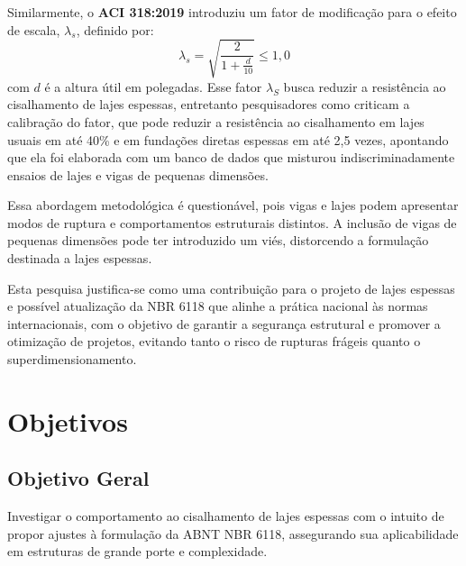 Similarmente, o \textbf{ACI 318:2019}\cite{ACI318:2019} introduziu um fator de modificação para o efeito de escala, $\lambda_s$, definido por:
\begin{equation}
\lambda_s = \sqrt{\frac{2}{1+\frac{d}{10}}}\leq 1,0
\end{equation}
com $d$ é a altura útil em polegadas. Esse fator $\lambda_S$ busca reduzir a resistência ao cisalhamento de lajes espessas, entretanto pesquisadores como \textcite{Marquesi2021} criticam a calibração do fator, que pode reduzir a resistência ao cisalhamento em lajes usuais em até 40\% e em fundações diretas espessas em até 2,5 vezes, apontando que ela foi elaborada com um banco de dados que misturou indiscriminadamente ensaios de lajes e vigas de pequenas dimensões.

Essa abordagem metodológica é questionável, pois vigas e lajes podem apresentar modos de ruptura e comportamentos estruturais distintos. A inclusão de vigas de pequenas dimensões pode ter introduzido um viés, distorcendo a formulação destinada a lajes espessas.

Esta pesquisa justifica-se como uma contribuição para o projeto de lajes espessas e possível atualização da NBR 6118 que alinhe a prática nacional às normas internacionais, com o objetivo de garantir a segurança estrutural e promover a otimização de projetos, evitando tanto o risco de rupturas frágeis quanto o superdimensionamento.

\chapter{Objetivos}
\section{Objetivo Geral}

Investigar o comportamento ao cisalhamento de lajes espessas com o intuito de propor ajustes à formulação da ABNT NBR 6118, assegurando sua aplicabilidade em estruturas de grande porte e complexidade.


